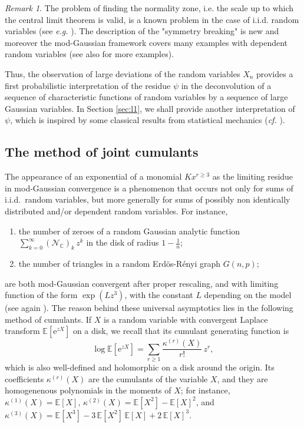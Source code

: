 \documentclass[12pt,a4paper,reqno]{amsart}
\newcommand{\CC}{\mathbb{C}}
\newcommand{\E}{\mathrm{e}}
\newcommand{\esper}{\mathbb{E}}
\theoremstyle{remark}
\newtheorem*{remark}{Remark}
\begin{document}
\begin{remark}
The problem of finding the normality zone, i.e. the scale up to which the central limit theorem is valid, is a known problem in the case of i.i.d. random variables (see \emph{e.g.} \cite{IL71}). The description of the "symmetry breaking" is new and moreover the mod-Gaussian framework covers many examples with dependent  random variables (see also \cite{FMN13} for more examples). 
\end{remark}

Thus, the observation of large deviations of the random variables $X_n$ provides a first probabilistic interpretation of the residue $\psi$ in the deconvolution of a sequence of characteristic functions of random variables by a sequence of large Gaussian variables. In Section \ref{sec:l1}, we shall provide another interpretation of $\psi$, which is inspired by some classical results from statistical mechanics (\emph{cf.} \cite{EN78,ENR80}).
\medskip



\subsection{The method of joint cumulants}\label{subsec:methjoint}
The appearance of an exponential of a monomial $Kx^{r \geq 3}$ as the limiting residue in mod-Gaussian convergence is a phenomenon that occurs not only for sums of i.i.d.~random variables, but more generally for sums of possibly non identically distributed and/or dependent random variables. For instance, \vspace{1mm}
\begin{enumerate}
\item the number of zeroes of a random Gaussian analytic function $\sum_{k=0}^\infty (\mathcal{N}_{\CC})_k\,z^k$ in the disk of radius $1-\frac{1}{n}$;\vspace{1mm}
\item the number of triangles in a random Erd\"os-R\'enyi graph $G(n,p)$;\vspace{1mm}
\end{enumerate}
are both mod-Gaussian convergent after proper rescaling, and with limiting function of the form $\exp(Lz^3)$, with the constant $L$ depending on the model (see again \cite{FMN13}). The reason behind these universal asymptotics lies in the following method of cumulants. If $X$ is a random variable with convergent Laplace transform $\esper[\E^{zX}]$ on a disk, we recall that its cumulant generating function is 
\begin{equation}
\log \esper[\E^{zX}]=\sum_{r \geq 1}\frac{\kappa^{(r)}(X)}{r!}\,z^r,\label{eq:cumulant}
\end{equation}
which is also well-defined and holomorphic on a disk around the origin. Its coefficients $\kappa^{(r)}(X)$ are the cumulants of the variable $X$, and they are homogenenous polynomials in the moments of $X$; for instance, $\kappa^{(1)}(X)=\esper[X]$, $\kappa^{(2)}(X)=\esper[X^2]-\esper[X]^2$, and $\kappa^{(3)}(X)=\esper[X^3]-3\,\esper[X^2]\,\esper[X]+2\,\esper[X]^3$. \bigskip
\end{document}
